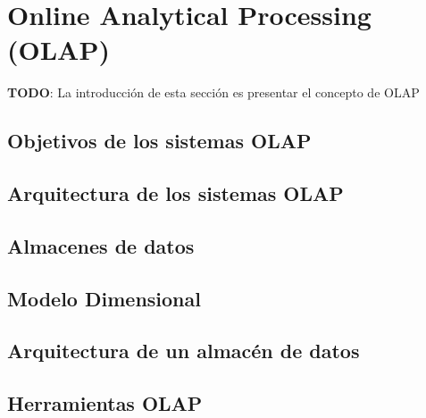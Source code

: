 \section{Online Analytical Processing (OLAP)} \label{section:olap}

\textbf{TODO}: La introducci\'on de esta secci\'on es presentar el concepto de OLAP

\subsection{Objetivos de los sistemas OLAP}
\subsection{Arquitectura de los sistemas OLAP}
\subsection{Almacenes de datos}
\subsection{Modelo Dimensional}
\subsection{Arquitectura de un almac\'en de datos}
\subsection{Herramientas OLAP}

